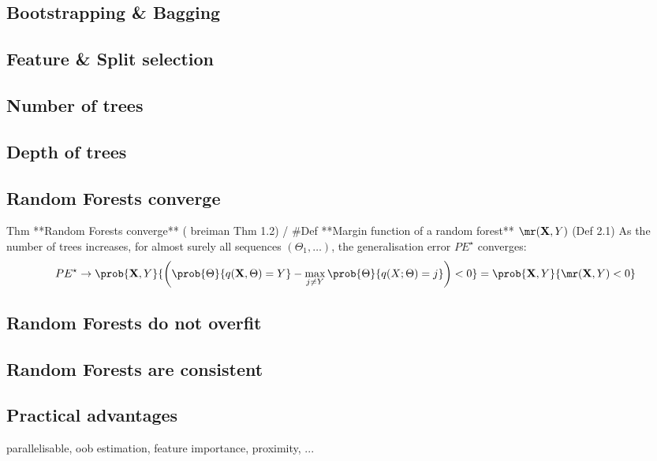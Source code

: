 \documentclass[../main.tex]{subfiles}
\begin{document}



\subsection{Bootstrapping \& Bagging}


\subsection{Feature \& Split selection}


\subsection{Number of trees}

\subsection{Depth of trees}

\subsection{Random Forests converge}

Thm **Random Forests converge** ( breiman Thm 1.2) / #Def **Margin function of a random forest** $\mr(\vec{X}, Y)$ (Def 2.1)
As the number of trees increases, for almost surely all sequences $(\Theta_{1}, \dots)$, the generalisation error $PE^\star$ converges:
$$
PE^\star \to \prob{\vec{X}, Y}{\left(\prob{\Theta}{q(\vec{X}, \Theta)=Y} - \max_{j \neq Y} \prob{\Theta}{q(X; \Theta) = j } \right) < 0
} 
= \prob{\vec{X}, Y}{
\mr(\vec{X}, Y)  < 0
}
$$

\subsection{Random Forests do not overfit}

\subsection{Random Forests are consistent}


\subsection{Practical advantages}
parallelisable, oob estimation, feature importance, proximity, ...
\end{document}
